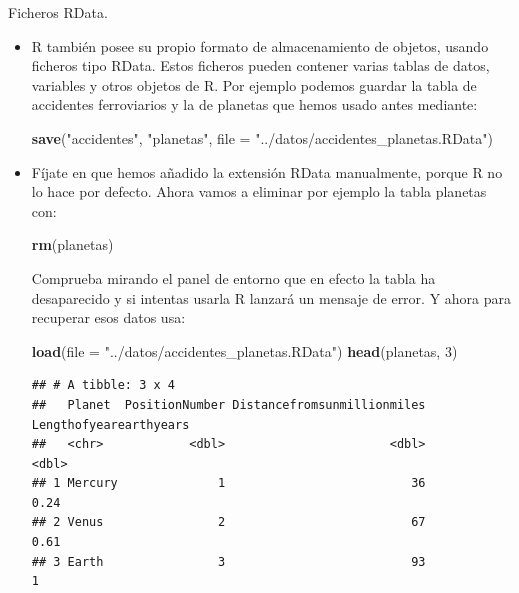 \documentclass[
  9pt,
  ignorenonframetext,
]{beamer}
\newenvironment{Shaded}{\begin{snugshade}}{\end{snugshade}}
\newcommand{\DataTypeTok}[1]{\textcolor[rgb]{0.13,0.29,0.53}{#1}}
\newcommand{\DecValTok}[1]{\textcolor[rgb]{0.00,0.00,0.81}{#1}}
\newcommand{\KeywordTok}[1]{\textcolor[rgb]{0.13,0.29,0.53}{\textbf{#1}}}
\newcommand{\NormalTok}[1]{#1}
\newcommand{\StringTok}[1]{\textcolor[rgb]{0.31,0.60,0.02}{#1}}
\begin{document}
\begin{frame}[fragile]{Ficheros RData.}
\protect\hypertarget{ficheros-rdata.}{}

\begin{itemize}
\item
  R también posee su propio formato de almacenamiento de objetos, usando
  ficheros tipo RData. Estos ficheros pueden contener varias tablas de
  datos, variables y otros objetos de R. Por ejemplo podemos guardar la
  tabla de accidentes ferroviarios y la de planetas que hemos usado
  antes mediante: \small

\begin{Shaded}
\begin{Highlighting}[]
\KeywordTok{save}\NormalTok{(}\StringTok{"accidentes"}\NormalTok{, }\StringTok{"planetas"}\NormalTok{, }\DataTypeTok{file =} \StringTok{"../datos/accidentes_planetas.RData"}\NormalTok{)}
\end{Highlighting}
\end{Shaded}
\end{itemize}

\normalsize

\begin{itemize}
\item
  Fíjate en que hemos añadido la extensión RData manualmente, porque R
  no lo hace por defecto. Ahora vamos a eliminar por ejemplo la tabla
  planetas con:

\begin{Shaded}
\begin{Highlighting}[]
\KeywordTok{rm}\NormalTok{(planetas)}
\end{Highlighting}
\end{Shaded}

  Comprueba mirando el panel de entorno que en efecto la tabla ha
  desaparecido y si intentas usarla R lanzará un mensaje de error. Y
  ahora para recuperar esos datos usa: \scriptsize

\begin{Shaded}
\begin{Highlighting}[]
\KeywordTok{load}\NormalTok{(}\DataTypeTok{file =} \StringTok{"../datos/accidentes_planetas.RData"}\NormalTok{)}
\KeywordTok{head}\NormalTok{(planetas, }\DecValTok{3}\NormalTok{)}
\end{Highlighting}
\end{Shaded}

\begin{verbatim}
## # A tibble: 3 x 4
##   Planet  PositionNumber Distancefromsunmillionmiles Lengthofyearearthyears
##   <chr>            <dbl>                       <dbl>                  <dbl>
## 1 Mercury              1                          36                   0.24
## 2 Venus                2                          67                   0.61
## 3 Earth                3                          93                   1
\end{verbatim}
\end{itemize}

\normalsize

\end{frame}
\end{document}
